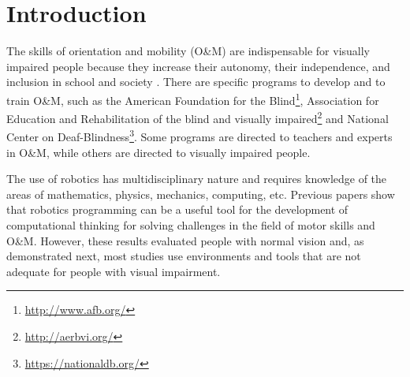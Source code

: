 \section{Introduction}
\label{sec:intro}

The skills of orientation and mobility (O\&M) are indispensable for visually impaired people  because they increase their autonomy, their independence, and inclusion in school and society \cite{dutra2003}. 
There are specific programs to develop and to train O\&M, such as the American Foundation for the Blind\footnote{\url{http://www.afb.org/}}, Association for Education and Rehabilitation of the blind and visually impaired\footnote{\url{http://aerbvi.org/}} and National Center on Deaf-Blindness\footnote{\url{https://nationaldb.org/}}. Some programs are directed to teachers and experts in O\&M, while others are directed to visually impaired people. 

The use of robotics has multidisciplinary nature and requires knowledge of the areas of mathematics, physics, mechanics, computing, etc. Previous papers show that robotics programming can be a useful tool for the development of computational thinking for solving challenges in the field of motor skills and O\&M\cite{azevedo2010}. However, these results evaluated people with normal vision and, as demonstrated next, most studies use environments and tools that are not adequate for people with visual impairment.


